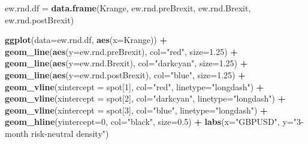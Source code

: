 \documentclass[]{book}
\newenvironment{Shaded}{\begin{snugshade}}{\end{snugshade}}
\newcommand{\KeywordTok}[1]{\textcolor[rgb]{0.13,0.29,0.53}{\textbf{#1}}}
\newcommand{\DataTypeTok}[1]{\textcolor[rgb]{0.13,0.29,0.53}{#1}}
\newcommand{\DecValTok}[1]{\textcolor[rgb]{0.00,0.00,0.81}{#1}}
\newcommand{\FloatTok}[1]{\textcolor[rgb]{0.00,0.00,0.81}{#1}}
\newcommand{\StringTok}[1]{\textcolor[rgb]{0.31,0.60,0.02}{#1}}
\newcommand{\OperatorTok}[1]{\textcolor[rgb]{0.81,0.36,0.00}{\textbf{#1}}}
\newcommand{\NormalTok}[1]{#1}
\theoremstyle{definition}
\theoremstyle{definition}
\theoremstyle{definition}
\theoremstyle{remark}
\begin{document}
\begin{Shaded}
\begin{Highlighting}[]
\NormalTok{ew.rnd.df =}\StringTok{ }\KeywordTok{data.frame}\NormalTok{(Krange, ew.rnd.preBrexit, ew.rnd.Brexit, ew.rnd.postBrexit)}

\KeywordTok{ggplot}\NormalTok{(}\DataTypeTok{data=}\NormalTok{ew.rnd.df, }\KeywordTok{aes}\NormalTok{(}\DataTypeTok{x=}\NormalTok{Krange)) }\OperatorTok{+}\StringTok{ }\KeywordTok{geom_line}\NormalTok{(}\KeywordTok{aes}\NormalTok{(}\DataTypeTok{y=}\NormalTok{ew.rnd.preBrexit), }\DataTypeTok{col=}\StringTok{"red"}\NormalTok{, }\DataTypeTok{size=}\FloatTok{1.25}\NormalTok{) }\OperatorTok{+}
\StringTok{  }\KeywordTok{geom_line}\NormalTok{(}\KeywordTok{aes}\NormalTok{(}\DataTypeTok{y=}\NormalTok{ew.rnd.Brexit), }\DataTypeTok{col=}\StringTok{"darkcyan"}\NormalTok{, }\DataTypeTok{size=}\FloatTok{1.25}\NormalTok{) }\OperatorTok{+}
\StringTok{  }\KeywordTok{geom_line}\NormalTok{(}\KeywordTok{aes}\NormalTok{(}\DataTypeTok{y=}\NormalTok{ew.rnd.postBrexit), }\DataTypeTok{col=}\StringTok{"blue"}\NormalTok{, }\DataTypeTok{size=}\FloatTok{1.25}\NormalTok{) }\OperatorTok{+}
\StringTok{  }\KeywordTok{geom_vline}\NormalTok{(}\DataTypeTok{xintercept =}\NormalTok{ spot[}\DecValTok{1}\NormalTok{], }\DataTypeTok{col=}\StringTok{"red"}\NormalTok{, }\DataTypeTok{linetype=}\StringTok{"longdash"}\NormalTok{) }\OperatorTok{+}\StringTok{ }
\StringTok{  }\KeywordTok{geom_vline}\NormalTok{(}\DataTypeTok{xintercept =}\NormalTok{ spot[}\DecValTok{2}\NormalTok{], }\DataTypeTok{col=}\StringTok{"darkcyan"}\NormalTok{, }\DataTypeTok{linetype=}\StringTok{"longdash"}\NormalTok{) }\OperatorTok{+}
\StringTok{  }\KeywordTok{geom_vline}\NormalTok{(}\DataTypeTok{xintercept =}\NormalTok{ spot[}\DecValTok{3}\NormalTok{], }\DataTypeTok{col=}\StringTok{"blue"}\NormalTok{, }\DataTypeTok{linetype=}\StringTok{"longdash"}\NormalTok{) }\OperatorTok{+}
\StringTok{  }\KeywordTok{geom_hline}\NormalTok{(}\DataTypeTok{yintercept=}\DecValTok{0}\NormalTok{, }\DataTypeTok{col=}\StringTok{"black"}\NormalTok{, }\DataTypeTok{size=}\FloatTok{0.5}\NormalTok{) }\OperatorTok{+}
\StringTok{  }\KeywordTok{labs}\NormalTok{(}\DataTypeTok{x=}\StringTok{"GBPUSD"}\NormalTok{, }\DataTypeTok{y=}\StringTok{"3-month risk-neutral density"}\NormalTok{)   }
\end{Highlighting}
\end{Shaded}
\end{document}
